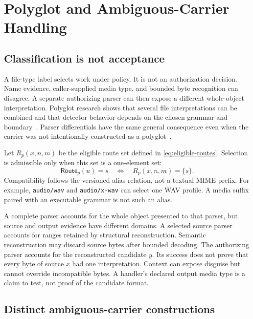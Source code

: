 \section{Polyglot and Ambiguous-Carrier Handling}
\label{sec:polyglots}

\subsection{Classification is not acceptance}

A file-type label selects work under policy. It is not an authorization
decision. Name evidence, caller-supplied media type, and bounded byte
recognition can disagree.
A separate authorizing parser can then expose a different whole-object
interpretation. Polyglot research shows that several file interpretations can
be combined and that detector behavior depends on the chosen grammar and
boundary~\cite{koch2025}. Parser differentials have the same
general consequence even when the carrier was not intentionally constructed as
a polyglot~\cite{jana2012,you2025}.

Let $R_p(x,n,m)$ be the eligible route set defined in
\cref{eq:eligible-routes}. Selection is admissible only when this set is a
one-element set:
\begin{equation}
  \mathsf{Route}_p(u)=s
  \quad\Longleftrightarrow\quad
  R_p(x,n,m)=\{s\}.
  \label{eq:type-convergence}
\end{equation}
Compatibility follows the versioned alias relation, not a textual MIME prefix.
For example, \texttt{audio/wav} and \texttt{audio/x-wav} can select one WAV
profile. A media suffix paired with an executable grammar is not such an alias.

A complete parser accounts for the whole object presented to that parser, but
source and output evidence have different domains. A selected source parser
accounts for ranges retained by structural reconstruction. Semantic
reconstruction may discard source bytes after bounded decoding.
The authorizing parser accounts for the reconstructed candidate \(y\). Its
success does not prove that every byte of source \(x\) had one interpretation.
Context can expose disguise but cannot override incompatible bytes. A handler's
declared output media type is a claim to test, not proof of the candidate format.

\subsection{Distinct ambiguous-carrier constructions}

